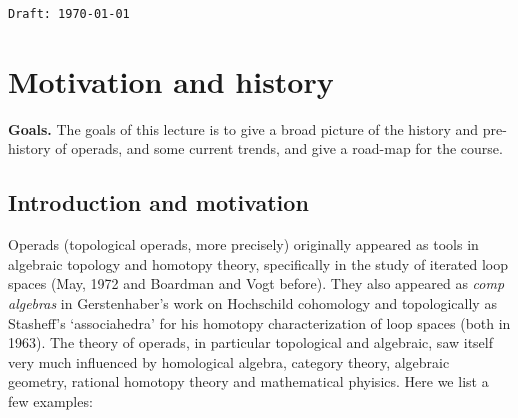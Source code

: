 \documentclass[fleqn, a4paper, twoside]{article}
\newcommand{\0}{\langle 0\rangle}
\DeclareRobustCommand{\[}{\begin{equation}}%
\DeclareRobustCommand{\]}{\end{equation}}%
\theoremstyle{mytheorem}
\theoremstyle{introthm}
\theoremstyle{mydefinition}
\theoremstyle{mydefinition2}
\theoremstyle{plain} %
\newcommand{\?}{\,?\,}
\theoremstyle{mytheorem}
\theoremstyle{plain} %
\newcommand\blankpage{%
    \null
    \thispagestyle{empty}%
    \newpage}
\begin{document}
\tableofcontents

\vfill

\hfill \texttt{Draft: \today} 

\afterpage{\blankpage}

\pagebreak

\thispagestyle{empty}


\section{Motivation and history}

\textbf{Goals.} The goals of this lecture is to
give a broad picture of the history and 
pre-history of operads, and some current trends,
and give a road-map for the course.  

\subsection{Introduction and motivation}

Operads (topological operads, more precisely)
originally appeared as tools in algebraic
topology and homotopy theory, 
specifically in the study of iterated loop 
spaces (May, 1972 and Boardman and Vogt before).
They also appeared as \emph{comp algebras} in Gerstenhaber's 
work on Hochschild cohomology and topologically as 
Stasheff's `associahedra' for his homotopy
characterization of loop spaces (both in 1963).
The theory of operads, in particular topological
and algebraic, saw itself very much influenced by
homological algebra, category theory, algebraic
geometry, rational homotopy theory and mathematical
phyisics. Here we list a few examples:
\end{document}
